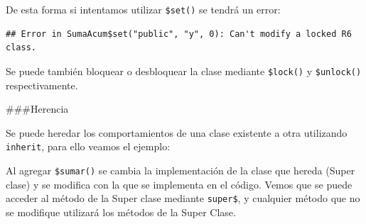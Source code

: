 \documentclass[
]{book}
\newenvironment{Shaded}{\begin{snugshade}}{\end{snugshade}}
\newcommand{\AttributeTok}[1]{\textcolor[rgb]{0.13,0.29,0.53}{#1}}
\newcommand{\ControlFlowTok}[1]{\textcolor[rgb]{0.13,0.29,0.53}{\textbf{#1}}}
\newcommand{\DecValTok}[1]{\textcolor[rgb]{0.00,0.00,0.81}{#1}}
\newcommand{\DocumentationTok}[1]{\textcolor[rgb]{0.56,0.35,0.01}{\textbf{\textit{#1}}}}
\newcommand{\FunctionTok}[1]{\textcolor[rgb]{0.13,0.29,0.53}{\textbf{#1}}}
\newcommand{\NormalTok}[1]{#1}
\newcommand{\OtherTok}[1]{\textcolor[rgb]{0.56,0.35,0.01}{#1}}
\newcommand{\SpecialCharTok}[1]{\textcolor[rgb]{0.81,0.36,0.00}{\textbf{#1}}}
\newcommand{\StringTok}[1]{\textcolor[rgb]{0.31,0.60,0.02}{#1}}
\begin{document}
De esta forma si intentamos utilizar \texttt{\$set()} se tendrá un error:

\begin{Shaded}
\end{Shaded}

\begin{verbatim}
## Error in SumaAcum$set("public", "y", 0): Can't modify a locked R6 class.
\end{verbatim}

Se puede también bloquear o desbloquear la clase mediante \texttt{\$lock()} y \texttt{\$unlock()} respectivamente.

\#\#\#Herencia

Se puede heredar los comportamientos de una clase existente a otra utilizando \texttt{inherit}, para ello veamos el ejemplo:

\begin{Shaded}
\end{Shaded}

Al agregar \texttt{\$sumar()} se cambia la implementación de la clase que hereda (Super clase) y se modifica con la que se implementa en el código. Vemos que se puede acceder al método de la Super clase mediante \texttt{super\$}, y cualquier método que no se modifique utilizará los métodos de la Super Clase.

\begin{Shaded}
\end{Shaded}
\end{document}
